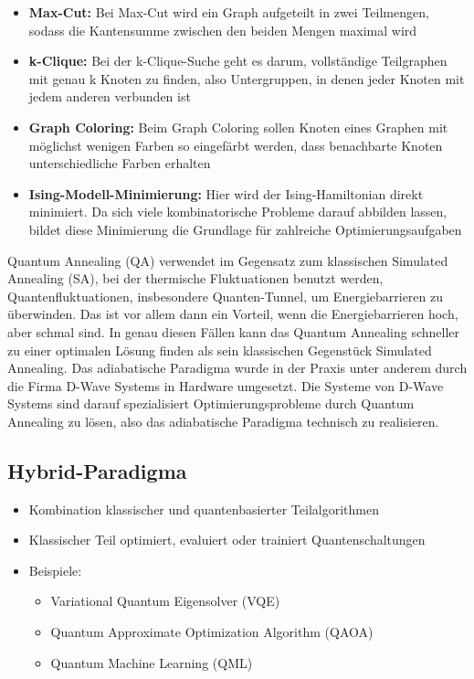 \begin{itemize}
    \item \textbf{Max-Cut: }Bei Max-Cut wird ein Graph aufgeteilt in zwei Teilmengen, sodass die Kantensumme zwischen den beiden Mengen maximal wird 
    \item 	\textbf{k-Clique:} Bei der k-Clique-Suche geht es darum, vollständige Teilgraphen mit genau k Knoten zu finden, also Untergruppen, in denen jeder Knoten mit jedem anderen verbunden ist 
    \item \textbf{Graph Coloring: }Beim Graph Coloring sollen Knoten eines Graphen mit möglichst wenigen Farben so eingefärbt werden, dass benachbarte Knoten unterschiedliche Farben erhalten 
    \item \textbf{Ising-Modell-Minimierung:} Hier wird der Ising-Hamiltonian direkt minimiert. Da sich viele kombinatorische Probleme darauf abbilden lassen, bildet diese Minimierung die Grundlage für zahlreiche Optimierungsaufgaben 
\end{itemize}
Quantum Annealing (QA) verwendet im Gegensatz zum klassischen Simulated Annealing (SA), bei der thermische Fluktuationen benutzt werden, Quantenfluktuationen, insbesondere Quanten-Tunnel, um Energiebarrieren zu überwinden. Das ist vor allem dann ein Vorteil, wenn die Energiebarrieren hoch, aber schmal sind. In genau diesen Fällen kann das Quantum Annealing schneller zu einer optimalen Lösung finden als sein klassischen Gegenstück Simulated Annealing. 
Das adiabatische Paradigma wurde in der Praxis unter anderem durch die Firma D-Wave Systems in Hardware umgesetzt. Die Systeme von D-Wave Systems sind darauf spezialisiert Optimierungsprobleme durch Quantum Annealing zu lösen, also das adiabatische Paradigma technisch zu realisieren. 
\subsection{Hybrid-Paradigma}
\begin{itemize}
    \item Kombination klassischer und quantenbasierter Teilalgorithmen
    \item Klassischer Teil optimiert, evaluiert oder trainiert Quantenschaltungen
    \item Beispiele:
    \begin{itemize}
        \item Variational Quantum Eigensolver (VQE)
        \item Quantum Approximate Optimization Algorithm (QAOA)
        \item Quantum Machine Learning (QML)
    \end{itemize}
\end{itemize}

